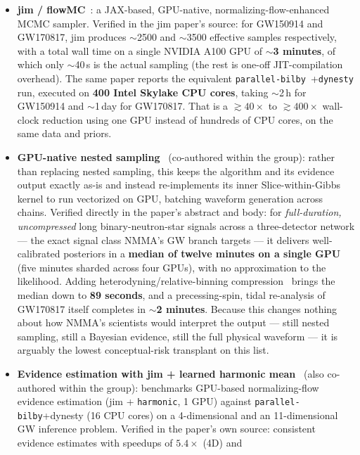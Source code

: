 \documentclass[11pt]{article}
\newcommand{\code}[1]{\texttt{#1}}
\begin{document}
\begin{itemize}[leftmargin=1.4em]
\item \textbf{jim / flowMC}~\cite{Wong:2023lgb,Wong:2022xvh}: a JAX-based, GPU-native,
normalizing-flow-enhanced MCMC sampler. Verified in the jim paper's source: for GW150914 and
GW170817, jim produces $\sim$2500 and $\sim$3500 effective samples respectively, with a total
wall time on a single NVIDIA A100 GPU of \textbf{$\sim$3 minutes}, of which only $\sim$40\,s
is the actual sampling (the rest is one-off JIT-compilation overhead). The same paper reports
the equivalent \code{parallel-bilby}~\cite{Talbot:2019okv}+\code{dynesty} run, executed on
\textbf{400 Intel Skylake CPU cores}, taking $\sim$2\,h for GW150914 and $\sim$1\,day for
GW170817. That is a $\gtrsim\!40\times$ to $\gtrsim\!400\times$ wall-clock reduction using one
GPU instead of hundreds of CPU cores, on the same data and priors.
\item \textbf{GPU-native nested sampling}~\cite{Yallup:2026nqc} (co-authored within the
group): rather than replacing nested sampling, this keeps the algorithm and its evidence
output exactly as-is and instead re-implements its inner Slice-within-Gibbs kernel to run
vectorized on GPU, batching waveform generation across chains. Verified directly in the
paper's abstract and body: for \emph{full-duration, uncompressed} long binary-neutron-star
signals across a three-detector network --- the exact signal class NMMA's GW branch targets
--- it delivers well-calibrated posteriors in a \textbf{median of twelve minutes on a single
GPU} (five minutes sharded across four GPUs), with no approximation to the likelihood. Adding
heterodyning/relative-binning compression~\cite{Zackay:2018qdy,Dai:2018dca} brings the median
down to \textbf{89 seconds}, and a precessing-spin, tidal re-analysis of GW170817 itself
completes in \textbf{$\sim$2 minutes}. Because this changes nothing about how NMMA's
scientists would interpret the output --- still nested sampling, still a Bayesian evidence,
still the full physical waveform --- it is arguably the lowest conceptual-risk transplant on
this list.
\item \textbf{Evidence estimation with jim + learned harmonic mean}~\cite{Polanska:2024zpn}
(also co-authored within the group): benchmarks GPU-based normalizing-flow evidence
estimation (jim + \code{harmonic}, 1 GPU) against \code{parallel-bilby}+dynesty (16 CPU
cores) on a 4-dimensional and an 11-dimensional GW inference problem. Verified in the paper's
own source: consistent evidence estimates with speedups of \textbf{$5.4\times$} (4D) and

\end{itemize}
\end{document}
